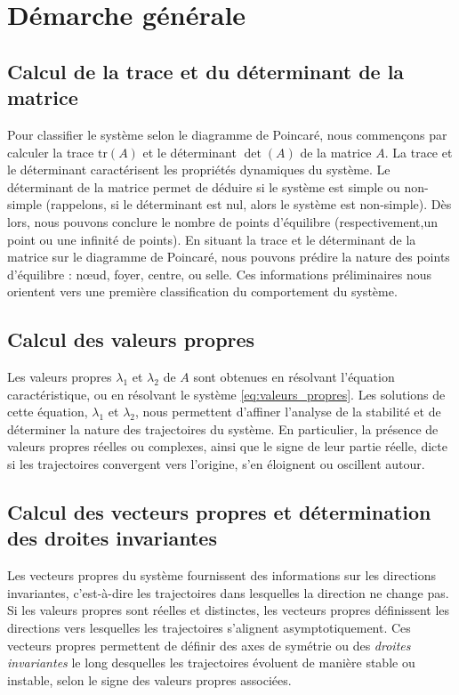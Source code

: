     \section{Démarche générale}
        \subsection{Calcul de la trace et du déterminant de la matrice}
        Pour classifier le système selon le diagramme de Poincaré, nous commençons par calculer la trace $\text{tr}(A)$ et le déterminant $\det(A)$ de la matrice $A$. La trace et le déterminant caractérisent les propriétés dynamiques du système. Le déterminant de la matrice permet de déduire si le système est simple ou non-simple (rappelons, si le déterminant est nul, alors le système est non-simple). Dès lors, nous pouvons conclure le nombre de points d'équilibre (respectivement,un point ou une infinité de points). En situant la trace et le déterminant de la matrice sur le diagramme de Poincaré, nous pouvons prédire la nature des points d'équilibre : nœud, foyer, centre, ou selle. Ces informations préliminaires nous orientent vers une première classification du comportement du système.

        \subsection{Calcul des valeurs propres}
            Les valeurs propres $\lambda_1$ et $\lambda_2$ de $A$ sont obtenues en résolvant l'équation caractéristique, ou en résolvant le système \ref{eq:valeurs_propres}. Les solutions de cette équation, $\lambda_1$ et $\lambda_2$, nous permettent d'affiner l’analyse de la stabilité et de déterminer la nature des trajectoires du système. En particulier, la présence de valeurs propres réelles ou complexes, ainsi que le signe de leur partie réelle, dicte si les trajectoires convergent vers l’origine, s’en éloignent ou oscillent autour.
            
        \subsection{Calcul des vecteurs propres et détermination des droites invariantes}
            Les vecteurs propres du système fournissent des informations sur les directions invariantes, c'est-à-dire les trajectoires dans lesquelles la direction ne change pas. Si les valeurs propres sont réelles et distinctes, les vecteurs propres définissent les directions vers lesquelles les trajectoires s’alignent asymptotiquement.
            Ces vecteurs propres permettent de définir des axes de symétrie ou des \textit{droites invariantes} le long desquelles les trajectoires évoluent de manière stable ou instable, selon le signe des valeurs propres associées.

